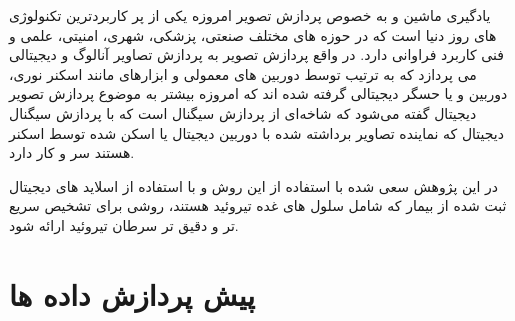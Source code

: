 
یادگیری ماشین و به خصوص پردازش تصویر امروزه یکی از پر کاربردترین تکنولوژی های روز دنیا است که در حوزه های مختلف صنعتی، پزشکی، شهری، امنیتی، علمی و فنی کاربرد فراوانی دارد.
در واقع پردازش تصویر به پردازش تصاویر آنالوگ و دیجیتالی می پردازد که به ترتیب توسط دوربین های معمولی و ابزارهای مانند اسکنر نوری، دوربین و یا حسگر دیجیتالی گرفته شده اند
که امروزه بیشتر به موضوع پردازش تصویر دیجیتال گفته می‌شود که شاخه‌ای از پردازش سیگنال است که با پردازش سیگنال دیجیتال که نماینده تصاویر برداشته شده با دوربین دیجیتال یا اسکن شده توسط اسکنر هستند سر و کار دارد.

در این پژوهش سعی شده با استفاده از این روش و با استفاده از اسلاید های دیجیتال ثبت شده از بیمار که شامل سلول های غده تیروئید هستند، روشی برای تشخیص سریع تر و دقیق تر سرطان تیروئید ارائه شود.


\section{پیش پردازش داده ها}\label{sec:پیش-پردازش-داده-ها}



